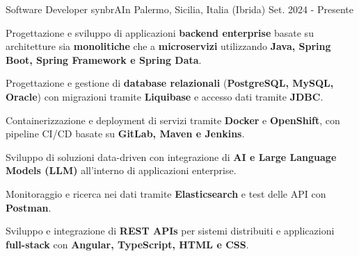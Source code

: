 
\begin{cventries}

  \cventry
    {Software Developer}
    {synbrAIn}
    {Palermo, Sicilia, Italia (Ibrida)}
    {Set. 2024 - Presente}
    {
      \begin{cvitems}
        \item {Progettazione e sviluppo di applicazioni \textbf{backend enterprise} basate su architetture sia \textbf{monolitiche} che a \textbf{microservizi} utilizzando \textbf{Java, Spring Boot, Spring Framework e Spring Data}.}
        \item {Progettazione e gestione di \textbf{database relazionali} (\textbf{PostgreSQL, MySQL, Oracle}) con migrazioni tramite \textbf{Liquibase} e accesso dati tramite \textbf{JDBC}.}
        \item {Containerizzazione e deployment di servizi tramite \textbf{Docker} e \textbf{OpenShift}, con pipeline CI/CD basate su \textbf{GitLab, Maven e Jenkins}.}
        \item {Sviluppo di soluzioni data-driven con integrazione di \textbf{AI e Large Language Models (LLM)} all’interno di applicazioni enterprise.}
        \item {Monitoraggio e ricerca nei dati tramite \textbf{Elasticsearch} e test delle API con \textbf{Postman}.}
        \item {Sviluppo e integrazione di \textbf{REST APIs} per sistemi distribuiti e applicazioni \textbf{full-stack} con \textbf{Angular, TypeScript, HTML e CSS}.}
        \\
      \end{cvitems}
    }


\end{cventries}
